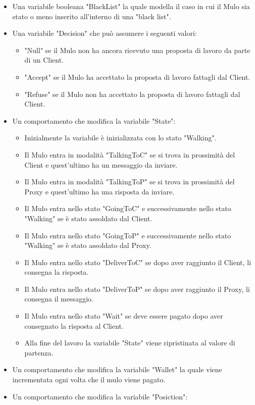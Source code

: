 \documentclass[13pt,a4paper]{article}
\begin{document}
\begin{itemize}
\begin{itemize}
\begin{itemize}
	\end{itemize}
	\item Una variabile booleana "BlackList" la quale modella il caso in cui il Mulo sia stato o meno inserito all'interno di una "black list".
 	\item Una variabile "Decision" che può assumere i seguenti valori:
 	\begin{itemize}
 		\item "Null" se il Mulo non ha ancora ricevuto una proposta di lavoro da parte di un Client.
 		\item "Accept" se il Mulo ha accettato la proposta di lavoro fattagli dal Client.
 		\item "Refuse" se il Mulo non ha accettato la proposta di lavoro fattagli dal Client.
 	\end{itemize}
		\item Un comportamento che modifica la variabile "State":
		\begin{itemize}
			\item Inizialmente la variabile è inizializzata con lo stato "Walking".
			\item Il Mulo entra in modalità "TalkingToC" se si trova in prossimità del Client e quest'ultimo ha un messaggio da inviare.
			\item Il Mulo entra in modalità "TalkingToP" se si trova in prossimità del Proxy e quest'ultimo ha una risposta da inviare.
			\item Il Mulo entra nello stato "GoingToC" e successivamente nello stato "Walking" se è stato assoldato dal Client.
			\item Il Mulo entra nello stato "GoingToP" e successivamente nello stato "Walking" se è stato assoldato dal Proxy.
			\item Il Mulo entra nello stato "DeliverToC" se dopo aver raggiunto il Client, li consegna la risposta.
			\item Il Mulo entra nello stato "DeliverToP" se dopo aver raggiunto il Proxy, li consegna il messaggio.
			\item Il Mulo entra nello stato "Wait" se deve essere pagato dopo aver consegnato la risposta al Client.
			\item Alla fine del lavoro la variabile "State" viene ripristinata al valore di partenza.
		\end{itemize}
		\item Un comportamento che modifica la variabile "Wallet" la quale viene incrementata ogni volta che il mulo viene pagato.
		\item Un comportamento che modifica la variabile "Posiction":

\end{itemize}
\end{itemize}
\end{document}
